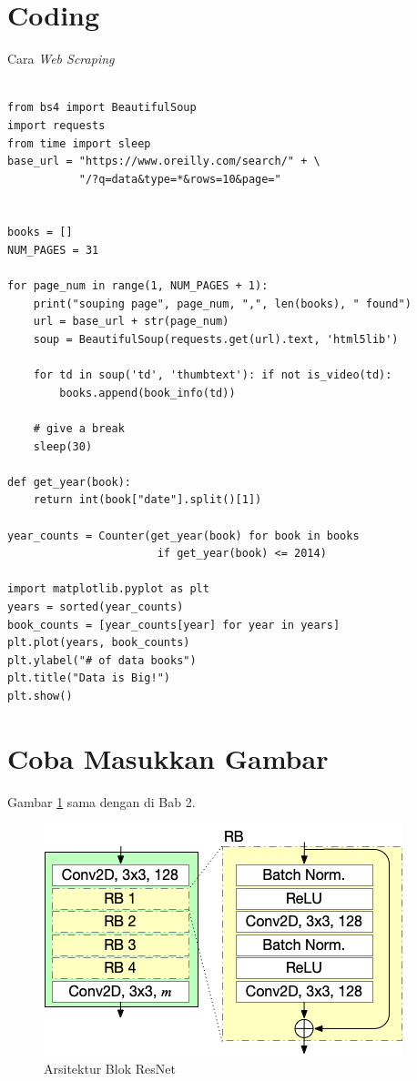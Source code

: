 \label{lampiran1}

\section{Coding}

\lipsum[1] %

\begin{myblock}{Cara \textit{Web Scraping}}\label{Lampiran1}
\begin{verbatim}

from bs4 import BeautifulSoup
import requests
from time import sleep
base_url = "https://www.oreilly.com/search/" + \
           "/?q=data&type=*&rows=10&page="


books = []
NUM_PAGES = 31

for page_num in range(1, NUM_PAGES + 1):
    print("souping page", page_num, ",", len(books), " found")
    url = base_url + str(page_num)
    soup = BeautifulSoup(requests.get(url).text, 'html5lib')
    
    for td in soup('td', 'thumbtext'): if not is_video(td):
        books.append(book_info(td))
        
    # give a break
    sleep(30)

def get_year(book):
    return int(book["date"].split()[1])

year_counts = Counter(get_year(book) for book in books 
                       if get_year(book) <= 2014)

import matplotlib.pyplot as plt
years = sorted(year_counts)
book_counts = [year_counts[year] for year in years] 
plt.plot(years, book_counts)
plt.ylabel("# of data books")
plt.title("Data is Big!")
plt.show()

\end{verbatim}
\end{myblock}

\section{Coba Masukkan Gambar}
Gambar \ref{fig:resnet} sama dengan di Bab 2.
\begin{figure}[h]
    \centering
    \includegraphics[scale=0.5]{BAB-2/resnet receiver.png}
    \caption{Arsitektur Blok ResNet}
    \label{fig:resnet}
\end{figure}